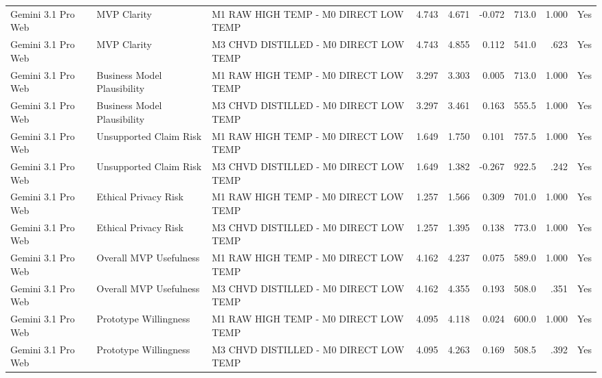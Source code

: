 \documentclass[10pt]{article}
\begin{document}
\begin{landscape}
\begin{longtable}{lllrrrrrr}
Gemini 3.1 Pro Web & MVP Clarity & M1 RAW HIGH TEMP - M0 DIRECT LOW TEMP & 4.743 & 4.671 & -0.072 & 713.0 & 1.000 & Yes \\
Gemini 3.1 Pro Web & MVP Clarity & M3 CHVD DISTILLED - M0 DIRECT LOW TEMP & 4.743 & 4.855 & 0.112 & 541.0 & .623 & Yes \\
Gemini 3.1 Pro Web & Business Model Plausibility & M1 RAW HIGH TEMP - M0 DIRECT LOW TEMP & 3.297 & 3.303 & 0.005 & 713.0 & 1.000 & Yes \\
Gemini 3.1 Pro Web & Business Model Plausibility & M3 CHVD DISTILLED - M0 DIRECT LOW TEMP & 3.297 & 3.461 & 0.163 & 555.5 & 1.000 & Yes \\
Gemini 3.1 Pro Web & Unsupported Claim Risk & M1 RAW HIGH TEMP - M0 DIRECT LOW TEMP & 1.649 & 1.750 & 0.101 & 757.5 & 1.000 & Yes \\
Gemini 3.1 Pro Web & Unsupported Claim Risk & M3 CHVD DISTILLED - M0 DIRECT LOW TEMP & 1.649 & 1.382 & -0.267 & 922.5 & .242 & Yes \\
Gemini 3.1 Pro Web & Ethical Privacy Risk & M1 RAW HIGH TEMP - M0 DIRECT LOW TEMP & 1.257 & 1.566 & 0.309 & 701.0 & 1.000 & Yes \\
Gemini 3.1 Pro Web & Ethical Privacy Risk & M3 CHVD DISTILLED - M0 DIRECT LOW TEMP & 1.257 & 1.395 & 0.138 & 773.0 & 1.000 & Yes \\
Gemini 3.1 Pro Web & Overall MVP Usefulness & M1 RAW HIGH TEMP - M0 DIRECT LOW TEMP & 4.162 & 4.237 & 0.075 & 589.0 & 1.000 & Yes \\
Gemini 3.1 Pro Web & Overall MVP Usefulness & M3 CHVD DISTILLED - M0 DIRECT LOW TEMP & 4.162 & 4.355 & 0.193 & 508.0 & .351 & Yes \\
Gemini 3.1 Pro Web & Prototype Willingness & M1 RAW HIGH TEMP - M0 DIRECT LOW TEMP & 4.095 & 4.118 & 0.024 & 600.0 & 1.000 & Yes \\
Gemini 3.1 Pro Web & Prototype Willingness & M3 CHVD DISTILLED - M0 DIRECT LOW TEMP & 4.095 & 4.263 & 0.169 & 508.5 & .392 & Yes \\
\end{longtable}
\end{landscape}
\end{document}
